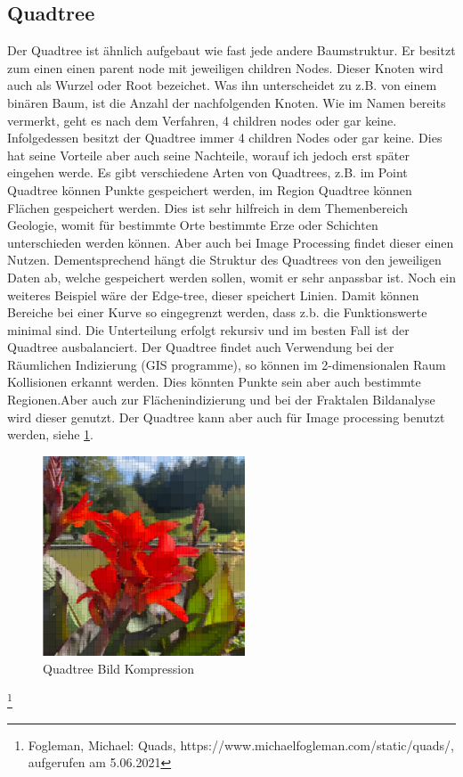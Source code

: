 \documentclass[11pt]{article}
\newcommand{\qt}{Quadtree }
\newcommand{\qts}{Quadtrees }
\newcommand{\fett}[1]{{\bf #1}}
\begin{document}
\subsection{\fett{\qt}} \label{Quadtree}

Der \qt ist ähnlich aufgebaut wie fast jede andere Baumstruktur. Er besitzt zum einen einen parent node mit jeweiligen children Nodes.
Dieser Knoten wird auch als Wurzel oder Root bezeichet. Was ihn unterscheidet zu z.B. von einem binären Baum, ist die Anzahl der nachfolgenden Knoten.
Wie im Namen bereits vermerkt, geht es nach dem Verfahren, 4 children nodes oder gar keine. Infolgedessen besitzt der \qt immer 4 children Nodes oder gar keine. Dies hat seine Vorteile aber auch seine Nachteile, worauf ich jedoch erst später eingehen werde. 
\newline
Es gibt verschiedene Arten von Quadtrees, z.B. im Point Quadtree können Punkte gespeichert werden, im Region \qt können Flächen gespeichert werden. Dies ist sehr hilfreich in dem Themenbereich Geologie, womit für bestimmte Orte bestimmte Erze oder Schichten unterschieden werden können.
Aber auch bei Image Processing findet dieser einen Nutzen. Dementsprechend hängt die Struktur des \qts von den jeweiligen Daten ab, welche gespeichert werden sollen, womit er sehr anpassbar ist.   
Noch ein weiteres Beispiel wäre der Edge-tree, dieser speichert Linien. Damit können Bereiche bei einer Kurve so eingegrenzt werden, dass z.b. die Funktionswerte minimal sind.  
\newline
Die Unterteilung erfolgt rekursiv und im besten Fall ist der \qt ausbalanciert. 
\newline
Der \qt findet auch Verwendung bei der Räumlichen Indizierung (GIS programme), so können im 2-dimensionalen Raum Kollisionen erkannt werden. Dies könnten Punkte sein aber auch bestimmte Regionen.Aber auch zur Flächenindizierung und bei der Fraktalen Bildanalyse wird dieser genutzt. 
\newline
Der \qt kann aber auch für Image processing benutzt werden, siehe \ref{quadtreeImageProcessing}. 

\begin{figure}[h]
    \begin{center}
    \includegraphics[width=6cm]{quadtreebildcompressionBlume.png}
    \caption{Quadtree Bild Kompression}
    \label{quadtreeImageProcessing}
    
    \end{center}
    \end{figure} \footnote[1]{Fogleman, Michael: Quads, https://www.michaelfogleman.com/static/quads/, aufgerufen am 5.06.2021}
\end{document}
